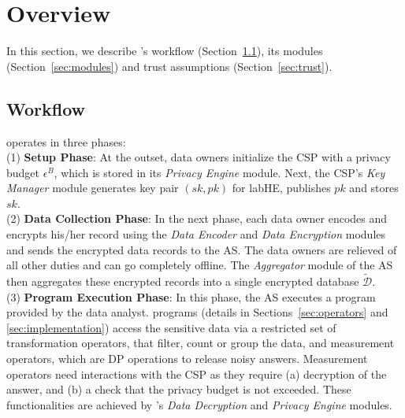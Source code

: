 


\section{\system Overview}\label{sec:overview}
In this section, we describe \system's workflow (Section~\ref{sec:wf}), its modules (Section~\ref{sec:modules}) and trust assumptions (Section~\ref{sec:trust}). %

\subsection{\system Workflow}\label{sec:wf}

\system operates in three phases: \\
(1) \textbf{Setup Phase}: At the outset, data owners initialize the \textsf{CSP} with a privacy budget $\epsilon^B$, which is stored in its \textit{Privacy Engine} module. Next, the  \textsf{CSP}'s \textit{Key Manager} module generates key pair $(sk,pk)$ for labHE, publishes $pk$ and stores $sk$. 
\\(2) \textbf{Data Collection Phase}: In the next phase, each data owner encodes and encrypts his/her record using the \textit{Data Encoder} and \textit{Data Encryption} modules and sends the encrypted data records to the \textsf{AS}. The data owners are relieved of all other duties and can go completely offline. The \textit{Aggregator} module of the \textsf{AS} then aggregates these encrypted records into a single encrypted database $\boldsymbol{\tilde{\mathcal{D}}}$.
\\(3) \textbf{Program Execution Phase}: In this phase, the \textsf{AS} executes a \system program provided by the data analyst. \system programs (details in Sections~\ref{sec:operators} and \ref{sec:implementation}) access the sensitive data via a restricted set of transformation operators, that filter, count or group the data, and measurement operators, which are DP operations to release noisy answers. Measurement operators need interactions with the \textsf{CSP} as they require (a) decryption of the answer, and (b) a check that the privacy budget is not exceeded. These  functionalities are achieved by \CSP's \textit{Data Decryption} and \textit{Privacy Engine} modules.

